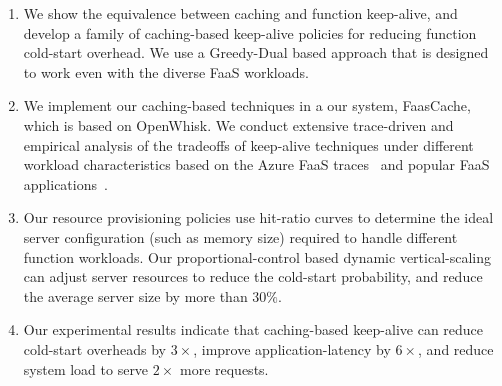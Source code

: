 \begin{enumerate}
\item We show the equivalence between caching and function keep-alive, and develop a family of caching-based keep-alive policies for reducing  function cold-start overhead. We use a Greedy-Dual based approach that is designed to work even with the diverse FaaS workloads. 

\item We implement our caching-based techniques in a our system, FaasCache, which is based on OpenWhisk. 
  We conduct extensive trace-driven and empirical analysis of the tradeoffs of keep-alive techniques under different workload characteristics based on the Azure FaaS traces~\cite{shahrad_serverless_2020} and popular FaaS applications~\cite{kim_functionbench_2019}.
  
 
\item Our resource provisioning policies use hit-ratio curves to determine the ideal server configuration (such as memory size) required to handle different function workloads.
  Our proportional-control based dynamic vertical-scaling  can adjust server resources to reduce the cold-start probability, and reduce the average server size by more than $30\%$. 

\item   Our experimental results indicate that caching-based keep-alive can reduce cold-start overheads by $3\times$,
  improve application-latency by $6\times$,
  and reduce system load to serve $2\times$ more requests.
\end{enumerate}

%
%








